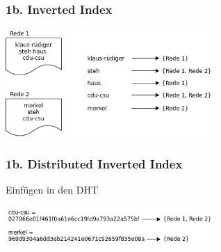 \documentclass{beamer}
\begin{document}
\begin{frame}
  \frametitle{1b. Inverted Index}

  \includegraphics[width=8cm]{inverted-index}
\end{frame}

\begin{frame}
  \frametitle{1b. Distributed Inverted Index}

  Einfügen in den DHT

  \medskip

  \includegraphics[width=8cm]{distributed-inverted-index}
\end{frame}
\end{document}
